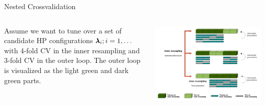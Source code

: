 \begin{frame}{Nested Crossvalidation}





\framebreak

\vspace{1cm}
\begin{columns}[c, onlytextwidth]
\hspace*{-0.3cm}
Assume we want to tune over a set of candidate HP configurations $\pmb{\lambda}_i; i = 1, \dots$ with 4-fold CV in the inner resampling and 3-fold CV in the outer loop. The outer loop is visualized as the light green and dark green parts.

\vspace*{-0.3cm}

\begin{center}\includegraphics[width = \textwidth]{images/Nested_Resampling.png}\end{center}
\end{columns}


\end{frame}

